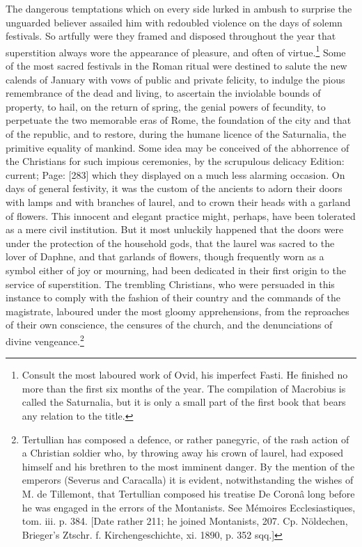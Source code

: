 The dangerous temptations which on every side lurked in ambush to surprise the unguarded believer assailed him with redoubled violence on the days of solemn festivals. So artfully were they framed and disposed throughout the year that superstition always wore the appearance of pleasure, and often of virtue.\footnote{Consult the most laboured work of Ovid, his imperfect Fasti. He finished no more than the first six months of the year. The compilation of Macrobius is called the Saturnalia, but it is only a small part of the first book that bears any relation to the title.} Some of the most sacred festivals in the Roman ritual were destined to salute the new calends of January with vows of public and private felicity, to indulge the pious remembrance of the dead and living, to ascertain the inviolable bounds of property, to hail, on the return of spring, the genial powers of fecundity, to perpetuate the two memorable eras of Rome, the foundation of the city and that of the republic, and to restore, during the humane licence of the Saturnalia, the primitive equality of mankind. Some idea may be conceived of the abhorrence of the Christians for such impious ceremonies, by the scrupulous delicacy Edition: current; Page: [283] which they displayed on a much less alarming occasion. On days of general festivity, it was the custom of the ancients to adorn their doors with lamps and with branches of laurel, and to crown their heads with a garland of flowers. This innocent and elegant practice might, perhaps, have been tolerated as a mere civil institution. But it most unluckily happened that the doors were under the protection of the household gods, that the laurel was sacred to the lover of Daphne, and that garlands of flowers, though frequently worn as a symbol either of joy or mourning, had been dedicated in their first origin to the service of superstition. The trembling Christians, who were persuaded in this instance to comply with the fashion of their country and the commands of the magistrate, laboured under the most gloomy apprehensions, from the reproaches of their own conscience, the censures of the church, and the denunciations of divine vengeance.\footnote{Tertullian has composed a defence, or rather panegyric, of the rash action of a Christian soldier who, by throwing away his crown of laurel, had exposed himself and his brethren to the most imminent danger. By the mention of the emperors (Severus and Caracalla) it is evident, notwithstanding the wishes of M. de Tillemont, that Tertullian composed his treatise De Coronâ long before he was engaged in the errors of the Montanists. See Mémoires Ecclesiastiques, tom. iii. p. 384. [Date rather 211; he joined Montanists, 207. Cp. Nöldechen, Brieger\texthebrew{}’s Ztschr. f. Kirchengeschichte, xi. 1890, p. 352 sqq.]}

